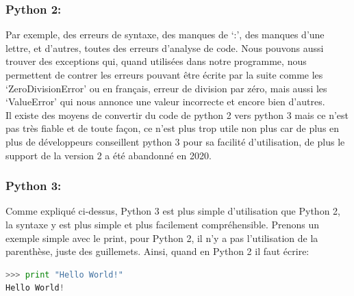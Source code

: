 \documentclass[a4paper, 12pt]{article}
\numberwithin{equation}{subsection}
\begin{document}
\subsubsection{Python 2:}
Par exemple, des erreurs de syntaxe, des manques de ‘:’, des manques d’une lettre, et d'autres, toutes des erreurs d’analyse de code. Nous pouvons aussi trouver des exceptions qui, quand utilisées dans notre programme, nous permettent de contrer les erreurs pouvant être écrite par la suite comme les ‘ZeroDivisionError’ ou en français, erreur de division par zéro, mais aussi les ‘ValueError’ qui nous annonce une valeur incorrecte et encore bien d’autres.\\
Il existe des moyens de convertir du code de python 2 vers python 3 mais ce n’est pas très fiable et de toute façon, ce n’est plus trop utile non plus car de plus en plus de développeurs conseillent python 3 pour sa facilité d’utilisation, de plus le support de la version 2 a été abandonné en 2020.
\subsubsection{Python 3:}
Comme expliqué ci-dessus, Python 3 est plus simple d’utilisation que Python 2, la syntaxe y est plus simple et plus facilement compréhensible. Prenons un exemple simple avec le print, pour Python 2, il n’y a pas l’utilisation de la parenthèse, juste des guillemets. Ainsi, quand en Python 2 il faut écrire:\\
\begin{lstlisting}[language=Python]
>>> print "Hello World!"
Hello World!
\end{lstlisting}
\end{document}
